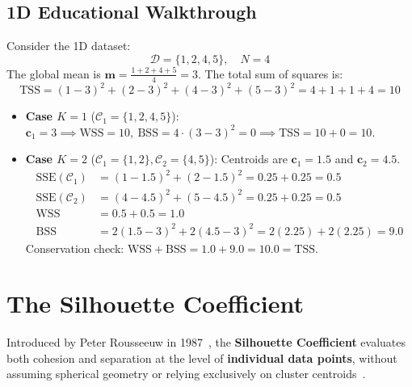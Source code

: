 \subsection{1D Educational Walkthrough}
Consider the 1D dataset:
\begin{equation}
\mathcal{D} = \{1, 2, 4, 5\}, \quad N = 4
\end{equation}
The global mean is $\mathbf{m} = \frac{1+2+4+5}{4} = 3$.
The total sum of squares is:
\begin{equation}
\mathrm{TSS} = (1-3)^2 + (2-3)^2 + (4-3)^2 + (5-3)^2 = 4 + 1 + 1 + 4 = 10
\end{equation}

\begin{itemize}
    \item \textbf{Case $K=1$} ($\mathcal{C}_1 = \{1, 2, 4, 5\}$):
    $\mathbf{c}_1 = 3 \implies \mathrm{WSS} = 10, \ \mathrm{BSS} = 4 \cdot (3-3)^2 = 0 \implies \mathrm{TSS} = 10 + 0 = 10$.
    \item \textbf{Case $K=2$} ($\mathcal{C}_1 = \{1, 2\}, \mathcal{C}_2 = \{4, 5\}$):
    Centroids are $\mathbf{c}_1 = 1.5$ and $\mathbf{c}_2 = 4.5$.
    \begin{align}
    \mathrm{SSE}(\mathcal{C}_1) &= (1-1.5)^2 + (2-1.5)^2 = 0.25 + 0.25 = 0.5 \\
    \mathrm{SSE}(\mathcal{C}_2) &= (4-4.5)^2 + (5-4.5)^2 = 0.25 + 0.25 = 0.5 \\
    \mathrm{WSS} &= 0.5 + 0.5 = 1.0 \\
    \mathrm{BSS} &= 2(1.5-3)^2 + 2(4.5-3)^2 = 2(2.25) + 2(2.25) = 9.0
    \end{align}
    Conservation check: $\mathrm{WSS} + \mathrm{BSS} = 1.0 + 9.0 = 10.0 = \mathrm{TSS}$.
\end{itemize}

\section{The Silhouette Coefficient}
\label{sec:dm-silhouette-coefficient}

Introduced by Peter Rousseeuw in 1987~\cite{rousseeuw1987}, the \textbf{Silhouette Coefficient} evaluates both cohesion and separation at the level of \textbf{individual data points}, without assuming spherical geometry or relying exclusively on cluster centroids~\cite{tan2018}.

